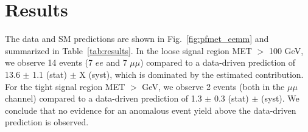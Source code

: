 
\section{Results}
\label{sec:results}

The data and SM predictions are shown in Fig.~\ref{fig:pfmet_eemm} and summarized in Table~\ref{tab:results}.
In the loose signal region MET $>$ 100 GeV, we observe 14 events (7 $ee$ and 7 $\mu\mu$)
compared to a data-driven prediction of 13.6 $\pm$ 1.1 (stat) $\pm$ X (syst),
which is dominated by the estimated \ttbar contribution. 
For the tight signal region MET $>$ \signalmett GeV, 
we observe 2 events (both in the $\mu\mu$ channel) compared to a 
data-driven prediction of 1.3 $\pm$ 0.3 (stat) $\pm$ (syst).
We conclude that no evidence for an anomalous event yield above the data-driven prediction is observed.
